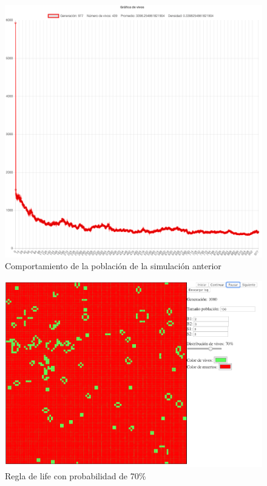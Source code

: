 	\begin{figure}[H]
		\begin{center}
			\includegraphics[scale=.24]{GOL/img/life60-2.png}
			\caption{Comportamiento de la población de la simulación anterior}
			\label{fig:gol5}
		\end{center}
	\end{figure}

	\begin{figure}[H]
		\begin{center}
			\includegraphics[scale=.3]{GOL/img/life70-1.png}
			\caption{Regla de life con probabilidad de 70\%}
			\label{fig:gol5}
		\end{center}
	\end{figure}

